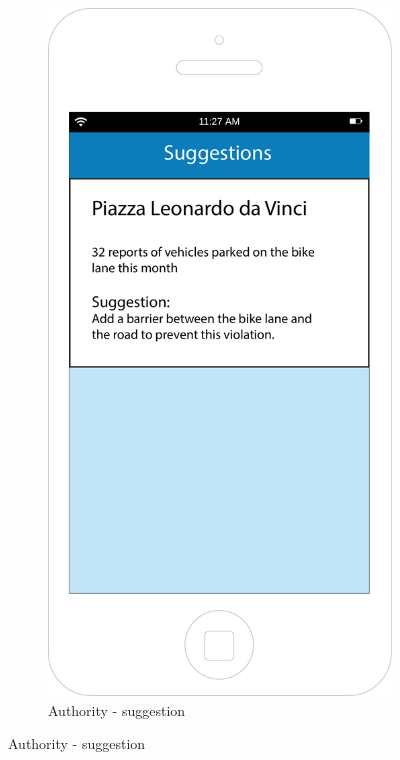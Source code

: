\documentclass[12pt,a4paper]{report}
\begin{document}
		\begin{figure}[H]
		\begin{subfigure}{0.5\textwidth}
		\setcounter{subfigure}{8}
			\includegraphics[scale=0.25, center]{Mysuggestions}
			\caption{Authority - suggestion}

\end{subfigure}
\end{figure}
\end{document}
